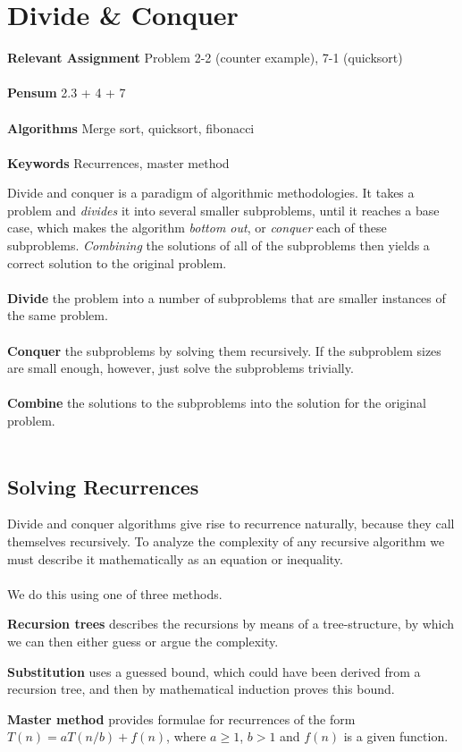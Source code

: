 
\chapter{Divide \& Conquer}
\label{ch:divideandconquer}

\textbf{Relevant Assignment} Problem 2-2 (counter example), 7-1 (quicksort)\\\\
\textbf{Pensum} 2.3 + 4 + 7 \cite{clrs} \\\\
\textbf{Algorithms} Merge sort, quicksort, fibonacci\\\\
\textbf{Keywords} Recurrences, master method
\vspace{1in}

\noindent Divide and conquer is a paradigm of algorithmic methodologies. It
takes a problem and \textit{divides} it into several smaller subproblems,
until it reaches a base case, which makes the algorithm \textit{bottom out},
or \textit{conquer} each of these subproblems. \textit{Combining} the
solutions of all of the subproblems then yields a correct solution to the
original problem.
\\\\
\noindent \textbf{Divide} the problem into a number of subproblems that are
smaller instances of the same problem.
\\\\
\noindent \textbf{Conquer} the subproblems by solving them recursively. If the
subproblem sizes are small enough, however, just solve the subproblems
trivially.
\\\\
\noindent \textbf{Combine} the solutions to the subproblems into the solution
for the original problem.
\\\\

\section{Solving Recurrences}
Divide and conquer algorithms give rise to recurrence naturally, because they
call themselves recursively. To analyze the complexity of any recursive
algorithm we must describe it mathematically as an equation or inequality.
\\\\
We do this using one of three methods.
\begin{description}
	\item \textbf{Recursion trees} describes the recursions by means of a
tree-structure, by which we can then either guess or argue the complexity.
	\item \textbf{Substitution} uses a guessed bound, which could have been
derived from a recursion tree, and then by mathematical induction proves this
bound.
	\item \textbf{Master method} provides formulae for recurrences of the form
$T(n) = a T(n/b) + f(n)$, where $a \geq 1$, $b > 1$ and $f(n)$ is a given
function.
\end{description}

